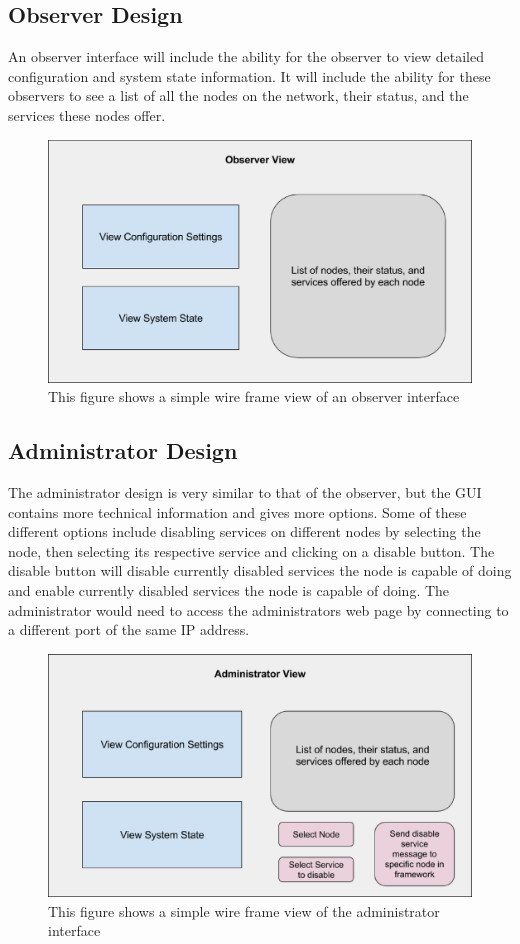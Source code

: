 \documentclass[draftclsnofoot, onecolumn, compsoc, 10pt]{IEEEtran}
\begin{document}
\subsection{Observer Design}
An observer interface will include the ability for the observer to view detailed configuration and system state information. It will include the ability for these observers to see a list of all the nodes on the network, their status, and the services these nodes offer.
\begin{figure}[H]
\centering
\includegraphics[scale=0.4]{observer}
\captionsetup{justification=centering}
\caption{This figure shows a simple wire frame view of an observer interface}
\end{figure}


\subsection{Administrator Design}
The administrator design is very similar to that of the observer, but the GUI contains more technical information and gives more options. Some of these different options include disabling services on different nodes by selecting the node, then selecting its respective service and clicking on a disable button. The disable button will disable currently disabled services the node is capable of doing and enable currently disabled services the node is capable of doing. 
The administrator would need to access the administrators web page by connecting to a different port of the same IP address.  
\begin{figure}[H]
\centering
\includegraphics[scale=0.4]{admin}
\captionsetup{justification=centering}
\caption{This figure shows a simple wire frame view of the administrator interface}
\end{figure}
\end{document}
